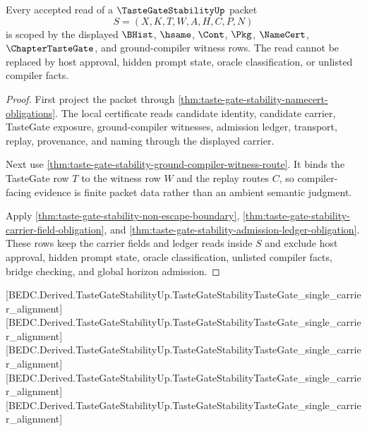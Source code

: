 \begin{theorem}
\label{thm:taste-gate-stability-scoped-dependency-boundary}
Every accepted read of a $\TasteGateStabilityUp$ packet
$$
S=(X,K,T,W,A,H,C,P,N)
$$
is scoped by the displayed $\BHist$, $\hsame$, $\Cont$, $\Pkg$, $\NameCert$, $\ChapterTasteGate$, and ground-compiler witness rows. The read cannot be replaced by host approval, hidden prompt state, oracle classification, or unlisted compiler facts.
\end{theorem}
\begin{proof}
First project the packet through \autoref{thm:taste-gate-stability-namecert-obligations}. The local certificate reads candidate identity, candidate carrier, TasteGate exposure, ground-compiler witnesses, admission ledger, transport, replay, provenance, and naming through the displayed carrier.

Next use \autoref{thm:taste-gate-stability-ground-compiler-witness-route}. It binds the TasteGate row $T$ to the witness row $W$ and the replay routes $C$, so compiler-facing evidence is finite packet data rather than an ambient semantic judgment.

Apply \autoref{thm:taste-gate-stability-non-escape-boundary}, \autoref{thm:taste-gate-stability-carrier-field-obligation}, and \autoref{thm:taste-gate-stability-admission-ledger-obligation}. These rows keep the carrier fields and ledger reads inside $S$ and exclude host approval, hidden prompt state, oracle classification, unlisted compiler facts, bridge checking, and global horizon admission.
\end{proof}

[BEDC.Derived.TasteGateStabilityUp.TasteGateStabilityTasteGate\_single\_carrier\_alignment]
[BEDC.Derived.TasteGateStabilityUp.TasteGateStabilityTasteGate\_single\_carrier\_alignment]
[BEDC.Derived.TasteGateStabilityUp.TasteGateStabilityTasteGate\_single\_carrier\_alignment]
[BEDC.Derived.TasteGateStabilityUp.TasteGateStabilityTasteGate\_single\_carrier\_alignment]
[BEDC.Derived.TasteGateStabilityUp.TasteGateStabilityTasteGate\_single\_carrier\_alignment]

